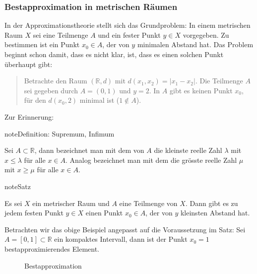 \documentclass[letterpaper,10pt,english]{jupyterBook}
\let\sphinxpxdimen\pdfpxdimen\else\newdimen\sphinxpxdimen
\begin{document}
\subsubsection{Bestapproximation in metrischen Räumen}
\label{\detokenize{Funktionalanalysis/Funktionalanalysis:bestapproximation-in-metrischen-raumen}}
In der Approximationstheorie stellt sich das Grundproblem: In einem metrischen Raum \(X\) sei eine Teilmenge \(A\) und ein fester Punkt \(y\in X\) vorgegeben. Zu bestimmen ist ein Punkt \(x_0 \in A\), der von \(y\) minimalen Abstand hat. Das Problem beginnt schon damit, dass es nicht klar, ist, dass es einen solchen Punkt überhaupt gibt:
\begin{quote}

Betrachte den Raum \((\mathbb{R}, d)\) mit \(d(x_1,x_2) = |x_1-x_2|\). Die Teilmenge \(A\) sei gegeben durch \(A = (0,1)\) und \(y=2\). In \(A\) gibt es keinen Punkt \(x_0\), für den \(d(x_0,2)\) minimal ist (\(1\not\in A\)).
\end{quote}

Zur Erinnerung:

\begin{sphinxadmonition}{note}{Definition: Supremum, Infimum}

Sei \(A\subset \mathbb{R}\), dann bezeichnet man mit dem  von \(A\) die kleinste reelle Zahl \(\lambda\) mit \(x\le \lambda\) für alle \(x\in A\). Analog bezeichnet man mit dem  die grösste reelle Zahl \(\mu\) mit \(x\ge \mu\) für alle \(x\in A\).
\end{sphinxadmonition}

\begin{sphinxadmonition}{note}{Satz}

Es sei \(X\) ein metrischer Raum und \(A\) eine  Teilmenge von \(X\). Dann gibt es zu jedem festen Punkt \(y \in X\) einen Punkt \(x_0 \in A\), der von \(y\) kleinsten Abstand hat.
\end{sphinxadmonition}

Betrachten wir das obige Beispiel angepasst auf die Voraussetzung im Satz: Sei \(A = [0,1] \subset \mathbb{R}\) ein kompaktes Intervall, dann ist der Punkt \(x_0 = 1\) bestapproximierendes Element.


\begin{wrapfigure}{l}{0pt}
\centering
\noindent\sphinxincludegraphics[height=250\sphinxpxdimen]{{Bestapproximation}.png}
\caption{Bestapproximation}\label{\detokenize{Funktionalanalysis/Funktionalanalysis:directive-fig}}\end{wrapfigure}
\end{document}
